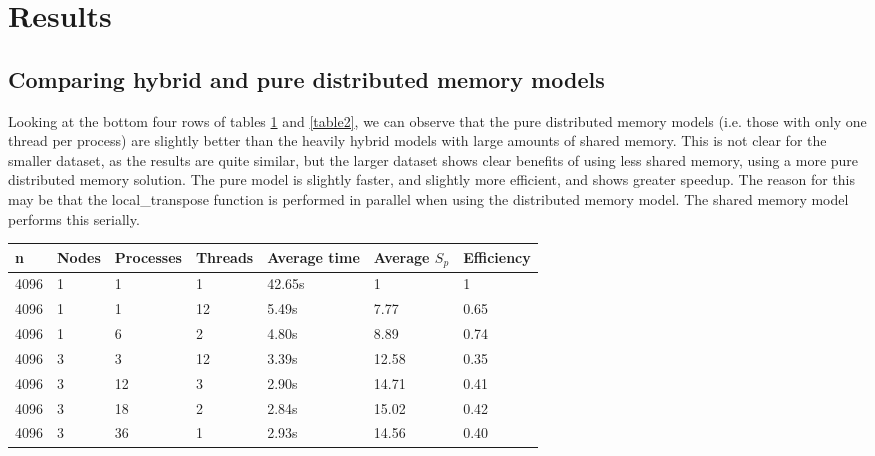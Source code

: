 \section{Results}

\subsection{Comparing hybrid and pure distributed memory models}

Looking at the bottom four rows of tables \ref{table1} and \ref{table2}, we can observe that the pure distributed memory models (i.e. those with only one thread per process) are slightly better than the heavily hybrid models with large amounts of shared memory. This is not clear for the smaller dataset, as the results are quite similar, but the larger dataset shows clear benefits of using less shared memory, using a more pure distributed memory solution. The pure model is slightly faster, and slightly more efficient, and shows greater speedup. The reason for this may be that the local_transpose function is performed in parallel when using the distributed memory model. The shared memory model performs this serially.

\begin{table}[h]
   \centering
    \begin{tabular}{| l | l | l | l | l | l | l |}
    \hline
    \bf{n} & \bf{Nodes} & \bf{Processes} &\bf{Threads} & \bf{Average time} & \bf{Average }$S_{p}$ & \bf{Efficiency} \\ \hline
	4096 & 1 & 1 & 1 & 42.65s & 1 & 1 \\ \hline
	4096 & 1 & 1 & 12 & 5.49s & 7.77 & 0.65  \\ \hline	
	4096 & 1 & 6 & 2 & 4.80s & 8.89 & 0.74 \\ \hline
	4096 & 3 & 3 & 12 & 3.39s & 12.58 & 0.35 \\ \hline
	4096 & 3 & 12 & 3 & 2.90s & 14.71 & 0.41 \\ \hline
	4096 & 3 & 18 & 2 & 2.84s & 15.02 & 0.42 \\ \hline	
	4096 & 3 & 36 & 1 & 2.93s & 14.56 & 0.40 \\ \hline
    \end{tabular}
	\label{table1}
\end{table}

